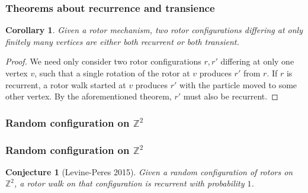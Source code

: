 \documentclass{beamer}
\newtheorem{conj}{Conjecture}
\newtheorem{cor}[theorem]{Corollary}
\begin{document}
\begin{frame}
	\frametitle{Theorems about recurrence and transience}
	
	\begin{cor}
		Given a rotor mechanism, two rotor configurations differing at only finitely many vertices are either both recurrent or both transient.
	\end{cor}
	
	\begin{proof}
		We need only consider two rotor configurations $r, r'$ differing at only one vertex $v$, such that a single rotation of the rotor at $v$ produces $r'$ from $r$. If $r$ is recurrent, a rotor walk started at $v$ produces $r'$ with the particle moved to some other vertex. By the aforementioned theorem, $r'$ must also be recurrent.
	\end{proof}
	
\end{frame}


\begin{frame}
	\frametitle{Random configuration on $\mathbb{Z}^2$}

\end{frame}


\begin{frame}
	\frametitle{Random configuration on $\mathbb{Z}^2$}
	
	\begin{conj}[Levine-Peres 2015]
		Given a random configuration of rotors on $\mathbb{Z}^2$, a rotor walk on that configuration is recurrent with probability $1$.
	\end{conj}
	
\end{frame}

\end{document}
